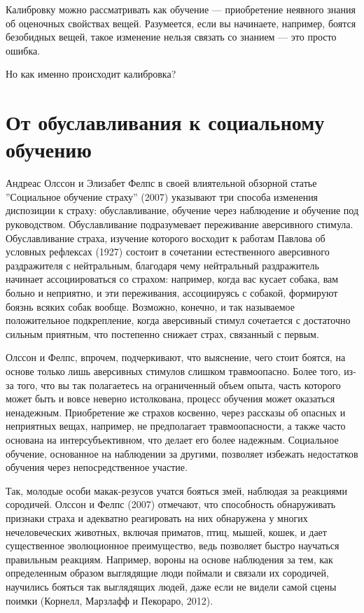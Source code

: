\documentclass[11pt]{book}
\begin{document}
Калибровку можно рассматривать как обучение --- приобретение неявного знания об оценочных свойствах вещей. Разумеется, если вы начинаете, например, боятся безобидных вещей, такое изменение нельзя связать со знанием --- это просто ошибка.

Но как именно происходит калибровка?

\section{От обуславливания к социальному обучению}

Андреас Олссон и Элизабет Фелпс в своей влиятельной обзорной статье ''Социальное обучение страху'' (2007) указывают три способа изменения диспозиции к страху: обуславливание, обучение через наблюдение и обучение под руководством. Обуславливание подразумевает переживание аверсивного стимула. Обуславливание страха, изучение которого восходит к работам Павлова об условных рефлексах (1927) состоит в сочетании естественного аверсивного раздражителя с нейтральным, благодаря чему нейтральный раздражитель начинает ассоциироваться со страхом: например, когда вас кусает собака, вам больно и неприятно, и эти переживания, ассоциируясь с собакой, формируют боязнь всяких собак вообще. Возможно, конечно, и так называемое положительное подкрепление, когда аверсивный стимул сочетается с достаточно сильным приятным, что постепенно снижает страх, связанный с первым.

Олссон и Фелпс, впрочем, подчеркивают, что выяснение, чего стоит боятся, на основе только лишь аверсивных стимулов слишком травмоопасно. Более того, из-за того, что вы так полагаетесь на ограниченный объем опыта, часть которого может быть и вовсе неверно истолкована, процесс обучения может оказаться ненадежным. Приобретение же страхов косвенно, через рассказы об опасных и неприятных вещах, например, не предполагает травмоопасности, а также часто основана на интерсубъективном, что делает его более надежным. Социальное обучение, основанное на наблюдении за другими, позволяет избежать недостатков обучения через непосредственное участие.

Так, молодые особи макак-резусов учатся бояться змей, наблюдая за реакциями сородичей. Олссон и Фелпс (2007) отмечают, что способность обнаруживать признаки страха и адекватно реагировать на них обнаружена у многих нечеловеческих животных, включая приматов, птиц, мышей, кошек, и дает существенное эволюционное преимущество, ведь позволяет быстро научаться правильным реакциям. Например, вороны на основе наблюдения за тем, как определенным образом выглядящие люди поймали и связали их сородичей, научились бояться так выглядящих людей, даже если не видели самой сцены поимки (Корнелл, Марзлафф и Пекораро, 2012).
\end{document}
